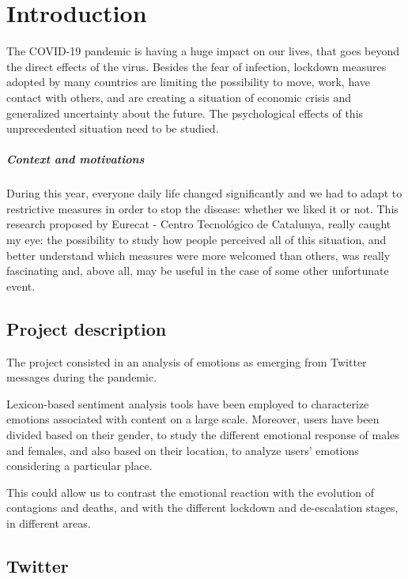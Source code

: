 \chapter{Introduction}
\label{cha:intro}

The COVID-19 pandemic is having a huge impact on our lives, that goes beyond the direct effects of the virus. Besides the fear of infection, lockdown measures adopted by many countries are limiting the possibility to move, work, have contact with others, and are creating a situation of economic crisis and generalized uncertainty about the future. The psychological effects of this unprecedented situation need to be studied.

\paragraph{Context and motivations}

During this year, everyone daily life changed significantly and we had to adapt to restrictive measures in order to stop the disease: whether we liked it or not. This research proposed by Eurecat - Centro Tecnológico de Catalunya, really caught my eye: the possibility to study how people perceived all of this situation, and better understand which measures were more welcomed than others, was really fascinating and, above all, may be useful in the case of some other unfortunate event.

\section{Project description}
\label{sec:project}

The project consisted in an analysis of emotions as emerging from Twitter messages during the pandemic.

Lexicon-based sentiment analysis tools have been employed to characterize emotions associated with content on a large scale. Moreover, users have been divided based on their gender, to study the different emotional response of males and females, and also based on their location, to analyze users' emotions considering a particular place. 

This could allow us to contrast the emotional reaction with the evolution of contagions and deaths, and with the different lockdown and de-escalation stages, in different areas.

\section{Twitter}
\label{sec:twitter}


